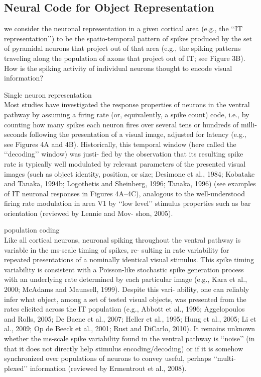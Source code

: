 \subsection{Neural Code for Object Representation}
we consider the neuronal representation in a given
cortical area (e.g., the ‘‘IT representation’’) to be the spatio-temporal pattern of spikes produced by the set of pyramidal neurons
that project out of that area (e.g., the spiking patterns traveling
along the population of axons that project out of IT; see
Figure 3B). How is the spiking activity of individual neurons
thought to encode visual information?

Single neuron representation\\
Most studies have investigated the response properties of
neurons in the ventral pathway by assuming a firing rate (or,
equivalently, a spike count) code, i.e., by counting how many
spikes each neuron fires over several tens or hundreds of milli-
seconds following the presentation of a visual image, adjusted
for latency (e.g., see Figures 4A and 4B). Historically, this
temporal window (here called the ‘‘decoding’’ window) was justi-
fied by the observation that its resulting spike rate is typically well
modulated by relevant parameters of the presented visual
images (such as object identity, position, or size; Desimone
et al., 1984; Kobatake and Tanaka, 1994b; Logothetis and
Sheinberg, 1996; Tanaka, 1996) (see examples of IT neuronal
responses in Figures 4A–4C), analogous to the well-understood
firing rate modulation in area V1 by ‘‘low level’’ stimulus
properties such as bar orientation (reviewed by Lennie and Mov-
shon, 2005).

population coding\\
Like all cortical neurons, neuronal spiking throughout the
ventral pathway is variable in the ms-scale timing of spikes, re-
sulting in rate variability for repeated presentations of a nominally
identical visual stimulus. This spike timing variability is consistent
with a Poisson-like stochastic spike generation process with an
underlying rate determined by each particular image (e.g., Kara
et al., 2000; McAdams and Maunsell, 1999). Despite this vari-
ability, one can reliably infer what object, among a set of tested
visual objects, was presented from the rates elicited across the
IT population (e.g., Abbott et al., 1996; Aggelopoulos and Rolls,
2005; De Baene et al., 2007; Heller et al., 1995; Hung et al., 2005;
Li et al., 2009; Op de Beeck et al., 2001; Rust and DiCarlo, 2010).
It remains unknown whether the ms-scale spike variability found
in the ventral pathway is ‘‘noise’’ (in that it does not directly help
stimulus encoding/decoding) or if it is somehow synchronized
over populations of neurons to convey useful, perhaps ‘‘multi-plexed’’ information (reviewed by Ermentrout et al., 2008).

